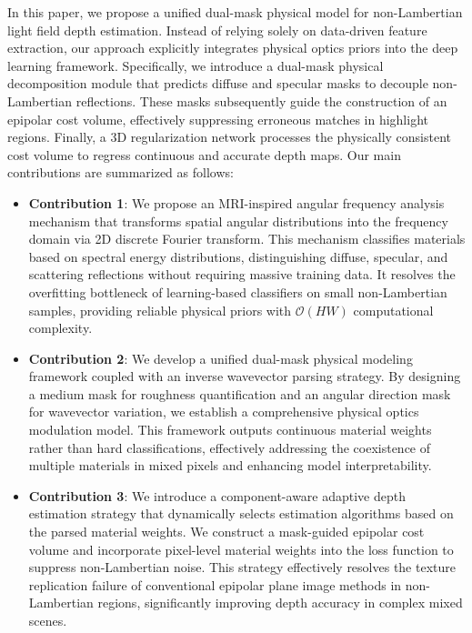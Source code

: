 \documentclass[lettersize,journal]{IEEEtran}
\begin{document}
In this paper, we propose a unified dual-mask physical model for non-Lambertian light field depth estimation. Instead of relying solely on data-driven feature extraction, our approach explicitly integrates physical optics priors into the deep learning framework. Specifically, we introduce a dual-mask physical decomposition module that predicts diffuse and specular masks to decouple non-Lambertian reflections. These masks subsequently guide the construction of an epipolar cost volume, effectively suppressing erroneous matches in highlight regions. Finally, a 3D regularization network processes the physically consistent cost volume to regress continuous and accurate depth maps. Our main contributions are summarized as follows:

\begin{itemize}\item \textbf{Contribution 1}: We propose an MRI-inspired angular frequency analysis mechanism that transforms spatial angular distributions into the frequency domain via 2D discrete Fourier transform. This mechanism classifies materials based on spectral energy distributions, distinguishing diffuse, specular, and scattering reflections without requiring massive training data. It resolves the overfitting bottleneck of learning-based classifiers on small non-Lambertian samples, providing reliable physical priors with $\mathcal{O}(HW)$ computational complexity.\end{itemize}

\begin{itemize}\item \textbf{Contribution 2}: We develop a unified dual-mask physical modeling framework coupled with an inverse wavevector parsing strategy. By designing a medium mask for roughness quantification and an angular direction mask for wavevector variation, we establish a comprehensive physical optics modulation model. This framework outputs continuous material weights rather than hard classifications, effectively addressing the coexistence of multiple materials in mixed pixels and enhancing model interpretability.\end{itemize}

\begin{itemize}\item \textbf{Contribution 3}: We introduce a component-aware adaptive depth estimation strategy that dynamically selects estimation algorithms based on the parsed material weights. We construct a mask-guided epipolar cost volume and incorporate pixel-level material weights into the loss function to suppress non-Lambertian noise. This strategy effectively resolves the texture replication failure of conventional epipolar plane image methods in non-Lambertian regions, significantly improving depth accuracy in complex mixed scenes.\end{itemize}
\end{document}
